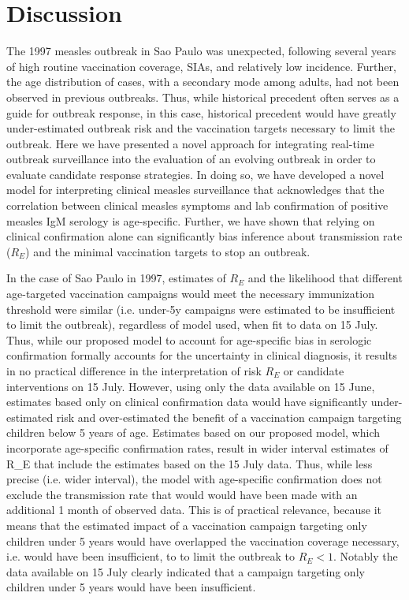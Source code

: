 \section{Discussion}\label{discussion}

The 1997 measles outbreak in Sao Paulo was unexpected, following several
years of high routine vaccination coverage, SIAs, and relatively low
incidence. Further, the age distribution of cases, with a secondary mode
among adults, had not been observed in previous outbreaks. Thus, while
historical precedent often serves as a guide for outbreak response, in
this case, historical precedent would have greatly under-estimated
outbreak risk and the vaccination targets necessary to limit the
outbreak. Here we have presented a novel approach for integrating
real-time outbreak surveillance into the evaluation of an evolving
outbreak in order to evaluate candidate response strategies. In doing
so, we have developed a novel model for interpreting clinical measles
surveillance that acknowledges that the correlation between clinical
measles symptoms and lab confirmation of positive measles IgM serology
is age-specific. Further, we have shown that relying on clinical
confirmation alone can significantly bias inference about transmission
rate (\(R_E\)) and the minimal vaccination targets to stop an outbreak.

In the case of Sao Paulo in 1997, estimates of \(R_E\) and the likelihood
that different age-targeted vaccination campaigns would meet the
necessary immunization threshold were similar (i.e. under-5y campaigns
were estimated to be insufficient to limit the outbreak), regardless of
model used, when fit to data on 15 July. Thus, while our proposed model
to account for age-specific bias in serologic confirmation formally
accounts for the uncertainty in clinical diagnosis, it results in no
practical difference in the interpretation of risk \(R_E\) or candidate
interventions on 15 July. However, using only the data available on 15
June, estimates based only on clinical confirmation data would have
significantly under-estimated risk and over-estimated the benefit of a
vaccination campaign targeting children below 5 years of age. Estimates
based on our proposed model, which incorporate age-specific confirmation
rates, result in wider interval estimates of R\_E that include the
estimates based on the 15 July data. Thus, while less precise (i.e.
wider interval), the model with age-specific confirmation does not
exclude the transmission rate that would would have been made with an
additional 1 month of observed data. This is of practical relevance,
because it means that the estimated impact of a vaccination campaign
targeting only children under 5 years would have overlapped the
vaccination coverage necessary, i.e. would have been insufficient, to to
limit the outbreak to \(R_E \lt 1\). Notably the data available on 15
July clearly indicated that a campaign targeting only children under 5
years would have been insufficient.

